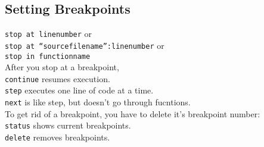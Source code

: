 \documentclass{article}
\begin{document}
\subsection{Setting Breakpoints}
{\tt stop at linenumber} or \\
{\tt stop at ``sourcefilename'':linenumber} or \\
{\tt stop in functionname}\\
After you stop at a breakpoint, \\
{\tt continue} resumes execution.\\
{\tt step} executes one line of code at a time.\\
{\tt next} is like step, but doesn't go through fucntions.\\
To get rid of a breakpoint, you have to delete it's 
breakpoint number:\\
{\tt status} shows current breakpoints.\\
{\tt delete} removes breakpoints.
\end{document}
